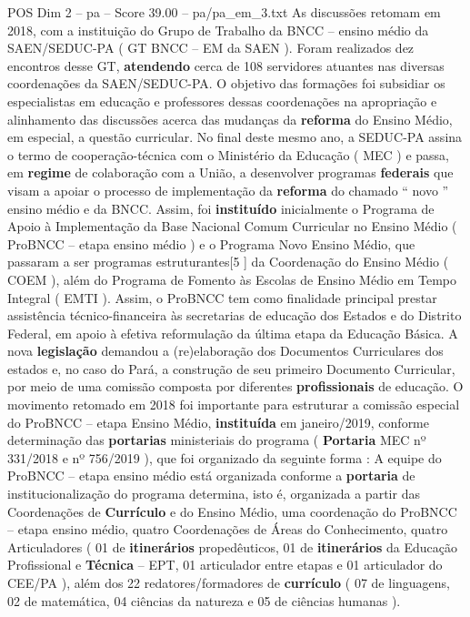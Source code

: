 \begin{textsample}{POS Dim 2 – pa – Score 39.00 – pa/pa\_em\_3.txt}
As discussões retomam em 2018, com a instituição do Grupo de Trabalho da BNCC – ensino médio da SAEN/SEDUC-PA ( GT BNCC – EM da SAEN ).
Foram realizados dez encontros desse GT, \textbf{atendendo} cerca de 108 servidores atuantes nas diversas coordenações da SAEN/SEDUC-PA.
O objetivo das formações foi subsidiar os especialistas em educação e professores dessas coordenações na apropriação e alinhamento das discussões acerca das mudanças da \textbf{reforma} do Ensino Médio, em especial, a questão curricular.
No final deste mesmo ano, a SEDUC-PA assina o termo de cooperação-técnica com o Ministério da Educação ( MEC ) e passa, em \textbf{regime} de colaboração com a União, a desenvolver programas \textbf{federais} que visam a apoiar o processo de implementação da \textbf{reforma} do chamado “ novo ” ensino médio e da BNCC.
Assim, foi \textbf{instituído} inicialmente o Programa de Apoio à Implementação da Base Nacional Comum Curricular no Ensino Médio ( ProBNCC – etapa ensino médio ) e o Programa Novo Ensino Médio, que passaram a ser programas estruturantes[5 ] da Coordenação do Ensino Médio ( COEM ), além do Programa de Fomento às Escolas de Ensino Médio em Tempo Integral ( EMTI ).
Assim, o ProBNCC tem como finalidade principal prestar assistência técnico-financeira às secretarias de educação dos Estados e do Distrito Federal, em apoio à efetiva reformulação da última etapa da Educação Básica.
A nova \textbf{legislação} demandou a (re)elaboração dos Documentos Curriculares dos estados e, no caso do Pará, a construção de seu primeiro Documento Curricular, por meio de uma comissão composta por diferentes \textbf{profissionais} de educação.
O movimento retomado em 2018 foi importante para estruturar a comissão especial do ProBNCC – etapa Ensino Médio, \textbf{instituída} em janeiro/2019, conforme determinação das \textbf{portarias} ministeriais do programa ( \textbf{Portaria} MEC nº 331/2018 e nº 756/2019 ), que foi organizado da seguinte forma : A equipe do ProBNCC – etapa ensino médio está organizada conforme a \textbf{portaria} de institucionalização do programa determina, isto é, organizada a partir das Coordenações de \textbf{Currículo} e do Ensino Médio, uma coordenação do ProBNCC – etapa ensino médio, quatro Coordenações de Áreas do Conhecimento, quatro Articuladores ( 01 de \textbf{itinerários} propedêuticos, 01 de \textbf{itinerários} da Educação Profissional e \textbf{Técnica} – EPT, 01 articulador entre etapas e 01 articulador do CEE/PA ), além dos 22 redatores/formadores de \textbf{currículo} ( 07 de linguagens, 02 de matemática, 04 ciências da natureza e 05 de ciências humanas ).

\end{textsample}
